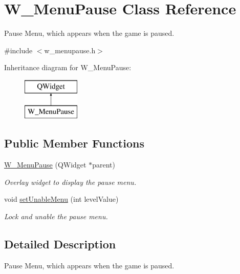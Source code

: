 \hypertarget{class_w___menu_pause}{}\section{W\+\_\+\+Menu\+Pause Class Reference}
\label{class_w___menu_pause}


Pause Menu, which appears when the game is paused.  




{\ttfamily \#include $<$w\+\_\+menupause.\+h$>$}

Inheritance diagram for W\+\_\+\+Menu\+Pause\+:\begin{figure}[H]
\begin{center}
\leavevmode
\includegraphics[height=2.000000cm]{class_w___menu_pause}
\end{center}
\end{figure}
\subsection*{Public Member Functions}
\begin{DoxyCompactItemize}
\item 
\hyperlink{class_w___menu_pause_a61d951b79b548ae4f6524310ad427e99}{W\+\_\+\+Menu\+Pause} (Q\+Widget $\ast$parent)
\begin{DoxyCompactList}\small\item\em Overlay widget to display the pause menu. \end{DoxyCompactList}\item 
void \hyperlink{class_w___menu_pause_ae2c5843c3f74ea871b6fe22be99cb91b}{set\+Unable\+Menu} (int level\+Value)
\begin{DoxyCompactList}\small\item\em Lock and unable the pause menu. \end{DoxyCompactList}\end{DoxyCompactItemize}


\subsection{Detailed Description}
Pause Menu, which appears when the game is paused. 

